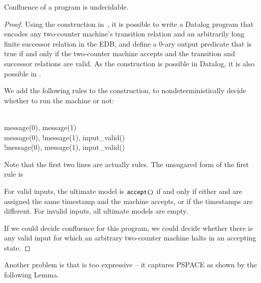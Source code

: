 \begin{lemma}
\label{lem:confluence-undecidable}
Confluence of a \lang program is undecidable.
\end{lemma}
\begin{proof}
Using the construction in~\cite{undecidable-datalog}, it is possible to write a Datalog program that encodes any two-counter machine's transition relation and an arbitrarily long finite successor relation in the EDB, and define a 0-ary output predicate  that is true if and only if the two-counter machine accepts and the transition and successor relations are valid.  As the construction is possible in Datalog, it is also possible in \lang.

We add the following rules to the construction, to nondeterministically decide whether to run the machine or not:

\begin{Drules}
   \\
        {message(0), message(1)} \\
        {message(0), !message(1), input\_valid()} \\
        {!message(0), message(1), input\_valid()}
\end{Drules}

Note that the first two lines are actually rules.  The unsugared form of the first rule is 

For valid inputs, the ultimate model is ${\dedalus{accept()}}$ if and only if either  and  are assigned the same timestamp and the machine accepts, or if the timestamps are different.  For invalid inputs, all ultimate models are empty.

If we could decide confluence for this program, we could decide whether there is any valid input for which an arbitrary two-counter machine halts in an accepting state.
\end{proof}


Another problem is that \lang is too expressive -- it captures PSPACE as shown by the following Lemma.

